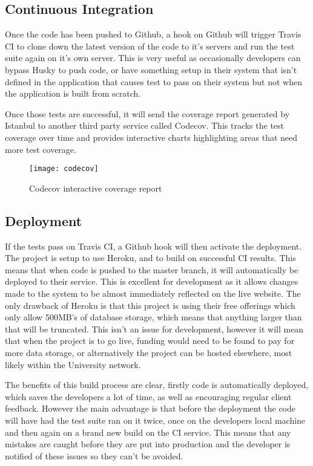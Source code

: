   \subsection{Continuous Integration}
    Once the code has been pushed to Github, a hook on Github will trigger Travis CI\cite{travis} to clone down the latest version of the code to it's servers and run the test suite again on it's own server. This is very useful as occasionally developers can bypass Husky to push code, or have something setup in their system that isn't defined in the application that causes test to pass on their system but not when the application is built from scratch. 

    Once those tests are successful, it will send the coverage report generated by Istanbul to another third party service called Codecov\cite{codecov}. This tracks the test coverage over time and provides interactive charts highlighting areas that need more test coverage. 

\begin{figure}[H]
\begin{center}
\texttt{[image: codecov]}
\caption{Codecov interactive coverage report}
\end{center}
\end{figure}



  \subsection{Deployment}
  If the tests pass on Travis CI, a Github hook will then activate the deployment. The project is setup to use Heroku\cite{heroku}, and to build on successful CI results. This means that when code is pushed to the master branch, it will automatically be deployed to their service. This is excellent for development as it allows changes made to the system to be almost immediately reflected on the live website. The only drawback of Heroku is that this project is using their free offerings which only allow 500MB's of database storage, which means that anything larger than that will be truncated. This isn't an issue for development, however it will mean that when the project is to go live, funding would need to be found to pay for more data storage, or alternatively the project can be hosted elsewhere, most likely within the University network.

  The benefits of this build process are clear, firstly code is automatically deployed, which saves the developers a lot of time, as well as encouraging regular client feedback. However the main advantage is that before the deployment the code will have had the test suite ran on it twice, once on the developers local machine and then again on a brand new build on the CI service. This means that any mistakes are caught before they are put into production and the developer is notified of these issues so they can't be avoided. 


